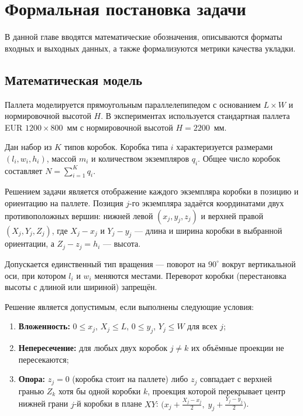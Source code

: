 \chapter{Формальная постановка задачи}
\label{cha:Formal}

В данной главе вводятся математические обозначения, описываются форматы входных и выходных данных, а также формализуются метрики качества укладки.

\section{Математическая модель}

Паллета моделируется прямоугольным параллелепипедом с основанием $L \times W$ и нормировочной высотой $H$. В экспериментах используется стандартная паллета EUR $1200 \times 800$~мм с нормировочной высотой $H = 2200$~мм.

Дан набор из $K$ типов коробок. Коробка типа $i$ характеризуется размерами $(l_i, w_i, h_i)$, массой $m_i$ и количеством экземпляров $q_i$. Общее число коробок составляет $N = \sum_{i=1}^{K} q_i$.

Решением задачи является отображение каждого экземпляра коробки в позицию и ориентацию на паллете. Позиция $j$-го экземпляра задаётся координатами двух противоположных вершин: нижней левой $(x_j, y_j, z_j)$ и верхней правой $(X_j, Y_j, Z_j)$, где $X_j - x_j$ и $Y_j - y_j$ --- длина и ширина коробки в выбранной ориентации, а $Z_j - z_j = h_i$ --- высота.

Допускается единственный тип вращения --- поворот на $90^{\circ}$ вокруг вертикальной оси, при котором $l_i$ и $w_i$ меняются местами. Переворот коробки (перестановка высоты с длиной или шириной) запрещён.

Решение является допустимым, если выполнены следующие условия:
\begin{enumerate}
  \item \textbf{Вложенность:} $0 \leq x_j$, $X_j \leq L$, $0 \leq y_j$, $Y_j \leq W$ для всех $j$;
  \item \textbf{Непересечение:} для любых двух коробок $j \neq k$ их объёмные проекции не пересекаются;
  \item \textbf{Опора:} $z_j = 0$ (коробка стоит на паллете) либо $z_j$ совпадает с верхней гранью $Z_k$ хотя бы одной коробки $k$, проекция которой перекрывает центр нижней грани $j$-й коробки в плане $XY$: $\bigl(x_j + \tfrac{X_j - x_j}{2},\; y_j + \tfrac{Y_j - y_j}{2}\bigr)$.
\end{enumerate}

